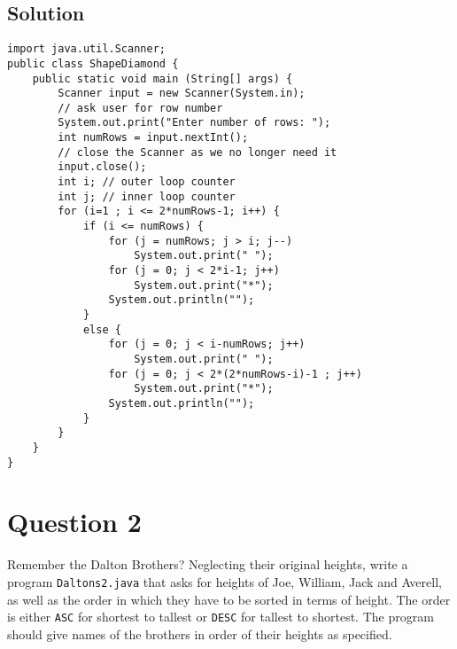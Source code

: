 \subsection*{Solution}
\lstset{language=Java}
\lstset{tabsize=2}
\begin{lstlisting}
import java.util.Scanner;
public class ShapeDiamond {
	public static void main (String[] args) {
		Scanner input = new Scanner(System.in);
		// ask user for row number
		System.out.print("Enter number of rows: ");
		int numRows = input.nextInt();
		// close the Scanner as we no longer need it
		input.close();
		int i; // outer loop counter
		int j; // inner loop counter
		for (i=1 ; i <= 2*numRows-1; i++) {
			if (i <= numRows) {
				for (j = numRows; j > i; j--)
					System.out.print(" ");
				for (j = 0; j < 2*i-1; j++)
					System.out.print("*");
				System.out.println("");
			}
			else {
				for (j = 0; j < i-numRows; j++)
					System.out.print(" ");
				for (j = 0; j < 2*(2*numRows-i)-1 ; j++)
					System.out.print("*");
				System.out.println("");
			}
		}
	}
}
\end{lstlisting}

\section*{Question 2}
Remember the Dalton Brothers? Neglecting their original heights, write a program \texttt{Daltons2.java} that asks for heights of Joe, William, Jack and Averell, as well as the order in which they have to be sorted in terms of height. The order is either \texttt{ASC} for shortest to tallest or \texttt{DESC} for tallest to shortest. The program should give names of the brothers in order of their heights as specified.

